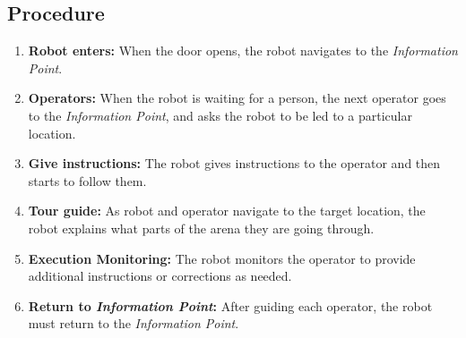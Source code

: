 \subsection*{Procedure}
\begin{enumerate}[nosep]

	\item \textbf{Robot enters:} When the door opens, the robot navigates to the \emph{Information Point}.
	\item \textbf{Operators:} When the robot is waiting for a person, the next operator goes to the \emph{Information Point}, and asks the robot to be led to a particular location.
	\item \textbf{Give instructions:} The robot gives instructions to the operator and then starts to follow them.
	\item \textbf{Tour guide:} As robot and operator navigate to the target location, the robot explains what parts of the arena they are going through.
	\item \textbf{Execution Monitoring:} The robot monitors the operator to provide additional instructions or corrections as needed.
	\item \textbf{Return to \emph{Information Point}:} After guiding each operator, the robot must return to the \emph{Information Point}.

\end{enumerate}

